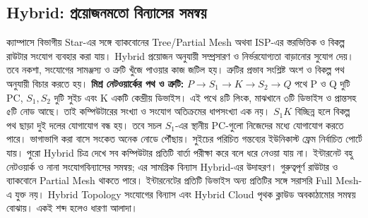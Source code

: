 \subsection{Hybrid: প্রয়োজনমতো বিন্যাসের সমন্বয়}
\label{ch2:c09-07}
ক্যাম্পাসে বিভাগীয় Star-এর সঙ্গে ব্যাকবোনের Tree/Partial Mesh অথবা ISP-এর স্তরভিত্তিক ও বিকল্প রাউটার সংযোগ ব্যবহার করা যায়। Hybrid প্রয়োজন অনুযায়ী সম্প্রসারণ ও নির্ভরযোগ্যতা বাড়ানোর সুযোগ দেয়। তবে নকশা, সংযোগের সামঞ্জস্য ও ত্রুটি খুঁজে পাওয়ার কাজ জটিল হয়। ত্রুটির প্রভাব সংশ্লিষ্ট অংশ ও বিকল্প পথ অনুযায়ী বিচার করতে হয়।
\textbf{মিশ্র নেটওয়ার্কের পথ ও ত্রুটি:} $P\to S_1\to K\to S_2\to Q$ পথে P ও Q দুটি PC, $S_1,S_2$ দুটি সুইচ এবং K একটি কেন্দ্রীয় ডিভাইস। এই পথে ৪টি লিংক, মাঝখানে ৩টি ডিভাইস ও প্রান্তসহ ৫টি নোড আছে। তাই কম্পিউটারের সংখ্যা ও সংযোগ অতিক্রমের ধাপসংখ্যা এক নয়। $S_1K$ বিচ্ছিন্ন হলে বিকল্প পথ ছাড়া দুই দলের যোগাযোগ বন্ধ হয়। তবে সচল $S_1$-এর স্থানীয় PC-গুলো নিজেদের মধ্যে যোগাযোগ করতে পারে। ভাগাভাগি করা বাসে সংকেত অনেক নোডে পৌঁছায়। সুইচের পরিচিত গন্তব্যের ইউনিকাস্ট ফ্রেম নির্বাচিত পোর্টে যায়। পুরো Hybrid চিত্র দেখে সব কম্পিউটার প্রতিটি বার্তা পরীক্ষা করে বলে ধরে নেওয়া যায় না।
ইন্টারনেট বহু নেটওয়ার্ক ও নানা সংযোগবিন্যাসের সমন্বয়; এর সামগ্রিক বিন্যাস Hybrid-এর উদাহরণ। গুরুত্বপূর্ণ রাউটার ও ব্যাকবোনে Partial Mesh থাকতে পারে। ইন্টারনেটের প্রতিটি ডিভাইস অন্য প্রতিটির সঙ্গে সরাসরি Full Mesh-এ যুক্ত নয়। Hybrid Topology সংযোগের বিন্যাস এবং Hybrid Cloud পৃথক ক্লাউড অবকাঠামোর সমন্বয় বোঝায়। একই শব্দ হলেও ধারণা আলাদা।



\endgroup
